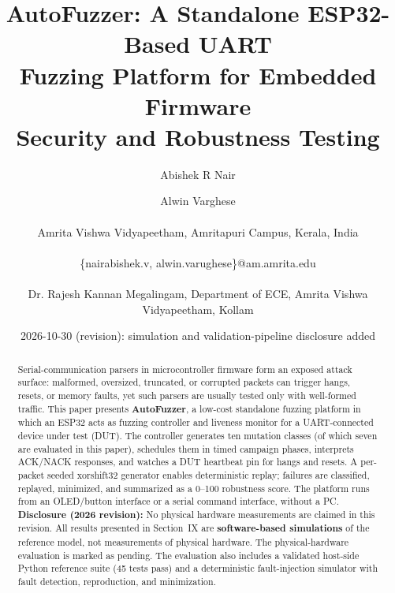 \documentclass[10pt,letterpaper]{article}
\begin{document}
\title{\textbf{AutoFuzzer: A Standalone ESP32-Based UART} \\ \textbf{Fuzzing Platform for Embedded Firmware \\ Security and Robustness Testing}}
\author{Abishek R Nair \and Alwin Varghese \\\\
  Amrita Vishwa Vidyapeetham, Amritapuri Campus, Kerala, India \\\\
  \{nairabishek.v, alwin.varughese\}@am.amrita.edu \\\\
  Dr. Rajesh Kannan Megalingam, Department of ECE, Amrita Vishwa Vidyapeetham, Kollam}
\date{2026-10-30 (revision): simulation and validation-pipeline disclosure added}

\maketitle

\begin{abstract}
Serial-communication parsers in microcontroller firmware form an exposed attack surface: malformed, oversized, truncated, or corrupted packets can trigger hangs, resets, or memory faults, yet such parsers are usually tested only with well-formed traffic. This paper presents \textbf{AutoFuzzer}, a low-cost standalone fuzzing platform in which an ESP32 acts as fuzzing controller and liveness monitor for a UART-connected device under test (DUT). The controller generates ten mutation classes (of which seven are evaluated in this paper), schedules them in timed campaign phases, interprets ACK/NACK responses, and watches a DUT heartbeat pin for hangs and resets. A per-packet seeded xorshift32 generator enables deterministic replay; failures are classified, replayed, minimized, and summarized as a 0--100 robustness score. The platform runs from an OLED/button interface or a serial command interface, without a PC. \textbf{Disclosure (2026 revision):} No physical hardware measurements are claimed in this revision. All results presented in Section~IX are \textbf{software-based simulations} of the reference model, not measurements of physical hardware. The physical-hardware evaluation is marked as pending. The evaluation also includes a validated host-side Python reference suite (45 tests pass) and a deterministic fault-injection simulator with fault detection, reproduction, and minimization.
\end{abstract}
\end{document}
